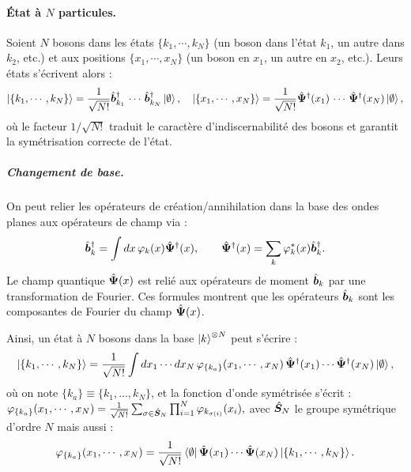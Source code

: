 \paragraph{État à $N$ particules.} Soient $N$ bosons dans les états $\{ k_1 , \cdots , k_N \}$ (un boson dans l’état $k_1$, un autre dans $k_2$, etc.) et aux positions $\{ x_1 , \cdots , x_N \}$ (un boson en $x_1$, un autre en $x_2$, etc.). Leurs états s’écrivent alors :
\begin{eqnarray}
	\ket{ \{ k_1 , \cdots , k_N \}} = \frac{1}{\sqrt{N!}} \hat{\bm{b}}_{k_1}^\dag\, \cdots \, \hat{\bm{b}}_{k_N}^\dag \ket{\emptyset}, \quad \ket{\{x_1 , \cdots , x_N\}} = \frac{1}{\sqrt{N!}} \hat{\bm{\Psi}}^\dag(x_1)\, \cdots \, \hat{\bm{\Psi}}^\dag(x_N) \ket{\emptyset}	, \label{eq.chap.1.ket.N}
\end{eqnarray}
où le facteur \( 1/\sqrt{N!} \) traduit le caractère d’indiscernabilité des bosons et garantit la symétrisation correcte de l’état.

\subparagraph{Changement de base.}
On peut relier les opérateurs de création/annihilation dans la base des ondes planes aux opérateurs de champ via :
\begin{eqnarray}
	\hat{\bm{b}}_k^\dagger = \int dx \, \varphi_k(x) \hat{\bm{\Psi}}^\dagger(x), \qquad 
	\hat{\bm{\Psi}}^\dagger(x) = \sum_k \varphi_k^\ast(x)\hat{\bm{b}}_k^\dagger.\label{eq.chap.1.TF.1}
\end{eqnarray}
Le champ quantique $\hat{\bm{\Psi}}(x)$ est relié aux opérateurs de moment $\hat{\bm{b}}_k$ par une transformation de Fourier. Ces formules montrent que les opérateurs $\hat{\bm{b}}_{k}$ sont les composantes de Fourier du champ $\hat{\bm{\Psi}}(x)$.

Ainsi, un état à \(N\) bosons dans la base \( \ket{k}^{\otimes N} \) peut s’écrire :
\begin{eqnarray}
	\ket{\{k_1 , \cdots , k_N\}} = \frac{1}{\sqrt{N!}} \int dx_1 \cdots dx_N \, \varphi_{\{k_a\}} ( x_1 , \cdots , x_N ) \, \hat{\bm{\Psi}}^\dag(x_1) \cdots \hat{\bm{\Psi}}^\dag(x_N) \ket{\emptyset},
\end{eqnarray}
où on note \( \{k_a\} \equiv \{k_1, \dots, k_N\} \), et la fonction d’onde symétrisée s’écrit :
\(
	\varphi_{\{k_a\}} ( x_1 , \cdots , x_N ) = \frac{1}{\sqrt{N!}} \sum_{\sigma \in \hat{\bm{S}}_N } \prod_{i=1}^N \varphi_{k_{\sigma(i)}}(x_i),
\) 
avec $\hat{\bm{S}}_N $  le groupe symétrique d'ordre $N$ mais aussi :
\begin{eqnarray}
	\varphi_{\{k_a\}} ( x_1 , \cdots , x_N ) = \frac{1}{\sqrt{N!}} \bra{\emptyset} \hat{\bm{\Psi}}(x_1) \cdots \hat{\bm{\Psi}}(x_N) \ket{\{k_1, \cdots , k_N\}}.
\end{eqnarray}



